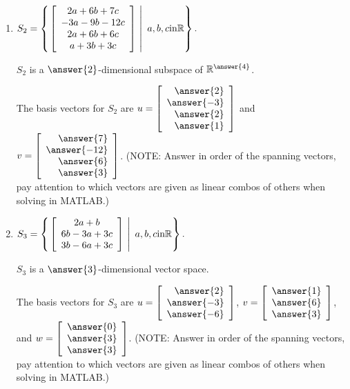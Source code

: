 \documentclass{ximera}
\begin{document}
\begin{exercise}
\begin{enumerate}
\begin{problem}
          \end{problem}

          \item $S_2 =
          \set{\left.\startmat{c}
                2a+6b+7c \\
                -3a-9b-12c \\
                2a+6b+6c \\
                a+3b+3c
              \stopmat ~\right\vert~a,b,c\text{in} \R}.$
    
                $S_2$ is a $\answer{2}$-dimensional subspace of $\R^{\answer{4}}$.
    
                \begin{problem}
    
                  The basis vectors for $S_2$ are $u=\startmat{r} \answer{2} \\ \answer{-3} \\ \answer{2} \\ \answer{1} \stopmat$ and $v=\startmat{r} \answer{7} \\ \answer{-12} \\ \answer{6} \\ \answer{3} \stopmat$. (NOTE: Answer in order of the spanning vectors, pay attention to which vectors are given as linear combos of others when solving in MATLAB.)
    
                \end{problem}
    
                \item $S_3 =
                \set{\left.\startmat{c}
                      2a+b \\
                      6b-3a+3c \\
                      3b-6a+3c
                    \stopmat ~\right\vert~a,b,c\text{in} \R}.$
          
                      $S_3$ is a $\answer{3}$-dimensional vector space.
          
                      \begin{problem}
          
                        The basis vectors for $S_3$ are $u=\startmat{r} 
                        \answer{2} \\ \answer{-3} \\ \answer{-6} \stopmat$, $v=\startmat{r} \answer{1} \\ \answer{6} \\ \answer{3} \stopmat$, and $w=\startmat{r} \answer{0} \\ \answer{3} \\ \answer{3} \stopmat$. (NOTE: Answer in order of the spanning vectors, pay attention to which vectors are given as linear combos of others when solving in MATLAB.)
          
                      \end{problem}       

    \end{enumerate}    
    

\end{exercise}
\end{document}
